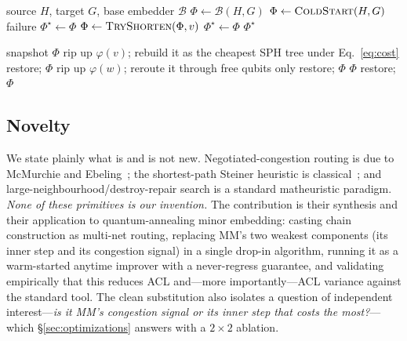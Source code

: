 \documentclass[acmsmall,anonymous,nonacm]{acmart}
\begin{document}
\begin{algorithm}[t]
\caption{Reweave (driver)}
\label{alg:driver}
\begin{algorithmic}[1]
\Require source $H$, target $G$, base embedder $\mathcal{B}$
\State $\Phi \gets \mathcal{B}(H,G)$ 
 $\Phi \gets \textsc{ColdStart}(H,G)$ 
\EndIf
{} \Return failure \EndIf
\State $\Phi^\star \gets \Phi$ 
\Repeat
     \State $\Phi \gets \textsc{TryShorten}(\Phi, v)$ 
      $\Phi^\star \gets \Phi$ \EndIf
  \EndFor
{}
\State \Return $\Phi^\star$
\end{algorithmic}
\end{algorithm}

\begin{algorithm}[t]
\caption{\textsc{TryShorten}$(\Phi, v)$ --- one LNS destroy-repair move}
\label{alg:move}
\begin{algorithmic}[1]
\State snapshot $\Phi$
\State rip up $\varphi(v)$; rebuild it as the cheapest SPH tree under
       Eq.~\eqref{eq:cost} 
 restore; \Return $\Phi$ \EndIf
{}
   \State rip up $\varphi(w)$; reroute it through free qubits only
    restore; \Return $\Phi$ \EndIf
\EndFor
{} \Return $\Phi$
\Else{} restore; \Return $\Phi$ \EndIf
\end{algorithmic}
\end{algorithm}

\subsection{Novelty}
\label{sec:novelty}
We state plainly what is and is not new. Negotiated-congestion routing is due to
McMurchie and Ebeling~\cite{mcmurchie1995pathfinder}; the shortest-path Steiner
heuristic is classical~\cite{takahashi1980sph,mehlhorn1988steiner}; and
large-neighbourhood/destroy-repair search is a standard matheuristic paradigm.
\emph{None of these primitives is our invention.} The contribution is their
synthesis and their application to quantum-annealing minor embedding: casting
chain construction as multi-net routing, replacing MM's two weakest components
(its inner step and its congestion signal) in a single drop-in algorithm,
running it as a warm-started anytime improver with a never-regress guarantee, and
validating empirically that this reduces ACL and---more importantly---ACL
variance against the standard tool. The clean substitution also isolates a
question of independent interest---\emph{is it MM's congestion signal or its
inner step that costs the most?}---which \S\ref{sec:optimizations} answers with a
$2{\times}2$ ablation.
\end{document}
